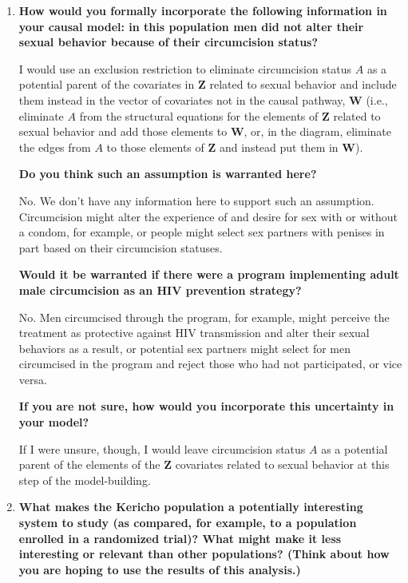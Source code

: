 \documentclass{article}
\begin{document}
\begin{enumerate}[label=\textbf{(\alph*)}]

  \item \textbf{How would you formally incorporate the following information in your causal model: in this population men did not alter their sexual behavior because of their circumcision status?}

  I would use an exclusion restriction to eliminate circumcision status $A$ as a potential parent of the covariates in $\bm{Z}$ related to sexual behavior and include them instead in the vector of covariates not in the causal pathway, $\bm{W}$ (i.e., eliminate $A$ from the structural equations for the elements of $\bm{Z}$ related to sexual behavior and add those elements to $\bm{W}$, or, in the diagram, eliminate the edges from $A$ to those elements of $\bm{Z}$ and instead put them in $\bm{W}$).

\vspace{2mm}

  \textbf{Do you think  such  an  assumption  is  warranted  here?}   
  
  No. We don’t have any information here to support such an assumption. Circumcision might alter the experience of and desire for sex with or without a condom, for example, or people might select sex partners with penises in part based on their circumcision statuses.

\vspace{2mm}

  \textbf{Would  it  be  warranted  if  there  were  a  program implementing adult male circumcision as an HIV prevention strategy?} 

  No. Men circumcised through the program, for example, might perceive the treatment as protective against HIV transmission and alter their sexual behaviors as a result, or potential sex partners might select for men circumcised in the program and reject those who had not participated, or vice versa.

\vspace{2mm}

  \textbf{If you are not sure, how would you incorporate this uncertainty in your model?}
    
  If I were unsure, though, I would leave circumcision status $A$ as a potential parent of the elements of the $\bm{Z}$ covariates related to sexual behavior at this step of the model-building.

  \item \textbf{What makes the Kericho population a potentially interesting system to study (as compared, for example, to a population enrolled in a randomized trial)? What might make it less interesting or relevant than other populations? (Think about how you are hoping to use the results of this analysis.)}
  

\end{enumerate}
\end{document}
